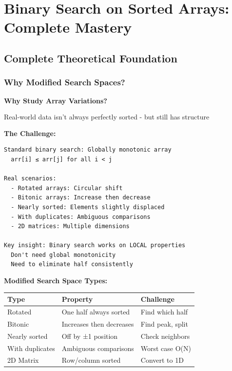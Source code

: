 \documentclass[11pt,a4paper,oneside]{book}
\begin{document}
\section{Binary Search on Sorted Arrays: Complete Mastery}

\subsection{Complete Theoretical Foundation}

\subsubsection{Why Modified Search Spaces?}

\begin{tcolorbox}[
    enhanced,breakable,
    colback=white,
    colframe=deepblue,
    boxrule=1.5pt,
    arc=3mm,
    title=\textbf{Beyond Simple Sorted Arrays}
]
\textbf{Why Study Array Variations?}

Real-world data isn't always perfectly sorted - but still has structure

\textbf{The Challenge:}
\begin{verbatim}
Standard binary search: Globally monotonic array
  arr[i] ≤ arr[j] for all i < j
  
Real scenarios:
  - Rotated arrays: Circular shift
  - Bitonic arrays: Increase then decrease
  - Nearly sorted: Elements slightly displaced
  - With duplicates: Ambiguous comparisons
  - 2D matrices: Multiple dimensions

Key insight: Binary search works on LOCAL properties
  Don't need global monotonicity
  Need to eliminate half consistently
\end{verbatim}

\textbf{Modified Search Space Types:}
\begin{center}
\begin{tabular}{|l|l|l|}
\hline
\rowcolor{lightgray}
\textbf{Type} & \textbf{Property} & \textbf{Challenge} \\
\hline
Rotated & One half always sorted & Find which half \\
\hline
Bitonic & Increases then decreases & Find peak, split \\
\hline
Nearly sorted & Off by ±1 position & Check neighbors \\
\hline
With duplicates & Ambiguous comparisons & Worst case O(N) \\
\hline
2D Matrix & Row/column sorted & Convert to 1D \\
\hline
\end{tabular}
\end{center}


\end{tcolorbox}
\end{document}
